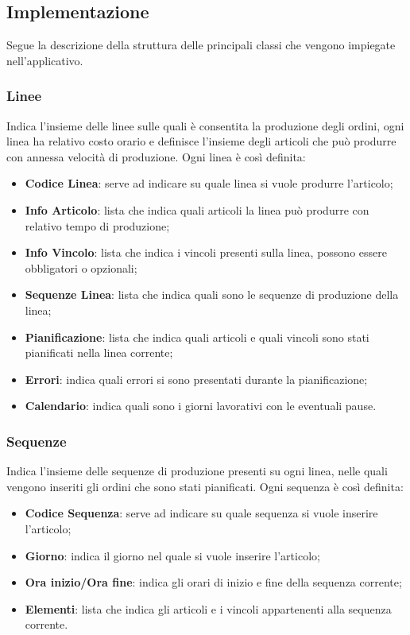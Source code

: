 \subsection{Implementazione}
Segue la descrizione della struttura delle principali classi che vengono impiegate nell'applicativo.

\subsubsection{Linee}
Indica l'insieme delle linee sulle quali è consentita la produzione degli ordini, ogni linea ha relativo costo orario e definisce l'insieme degli articoli che può produrre con annessa velocità di produzione.
Ogni linea è così definita:
\begin{itemize}
	\item \textbf{Codice Linea}: serve ad indicare su quale linea si vuole produrre l'articolo;
	\item \textbf{Info Articolo}: lista che indica quali articoli la linea può produrre con relativo tempo di produzione;
	\item \textbf{Info Vincolo}: lista che indica i vincoli presenti sulla linea, possono essere obbligatori o opzionali;
	
	\item \textbf{Sequenze Linea}: lista che indica quali sono le sequenze di produzione della linea;
	
	\item \textbf{Pianificazione}: lista che indica quali articoli e quali vincoli sono stati pianificati nella linea corrente;
	
	
	\item \textbf{Errori}: indica quali errori si sono presentati durante la pianificazione;
	
	\item \textbf{Calendario}: indica quali sono i giorni lavorativi con le eventuali pause.
	
\end{itemize}

\subsubsection{Sequenze}
Indica l'insieme delle sequenze di produzione presenti su ogni linea, nelle quali vengono inseriti gli ordini che sono stati pianificati.
Ogni sequenza è così definita:
\begin{itemize}
	\item \textbf{Codice Sequenza}: serve ad indicare su quale sequenza si vuole inserire l'articolo;
	\item \textbf{Giorno}: indica il giorno nel quale si vuole inserire l'articolo;
	\item \textbf{Ora inizio/Ora fine}: indica gli orari di inizio e fine della sequenza corrente;
	
	\item \textbf{Elementi}: lista che indica gli articoli e i vincoli appartenenti alla sequenza corrente.
	
\end{itemize}

